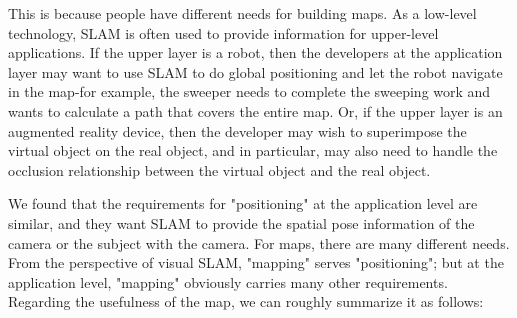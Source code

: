 This is because people have different needs for building maps. As a low-level technology, SLAM is often used to provide information for upper-level applications. If the upper layer is a robot, then the developers at the application layer may want to use SLAM to do global positioning and let the robot navigate in the map-for example, the sweeper needs to complete the sweeping work and wants to calculate a path that covers the entire map. Or, if the upper layer is an augmented reality device, then the developer may wish to superimpose the virtual object on the real object, and in particular, may also need to handle the occlusion relationship between the virtual object and the real object.

We found that the requirements for "positioning" at the application level are similar, and they want SLAM to provide the spatial pose information of the camera or the subject with the camera. For maps, there are many different needs. From the perspective of visual SLAM, "mapping" serves "positioning"; but at the application level, "mapping" obviously carries many other requirements. Regarding the usefulness of the map, we can roughly summarize it as follows:

